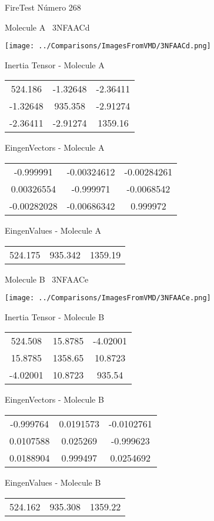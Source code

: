 \vtab[-3cm]
\begin{center}
{\large FireTest \tab Número 268}
\end{center}
\begin{multicols}{2}
\begin{center}

Molecule A \
3NFAACd

\texttt{[image: ../Comparisons/ImagesFromVMD/3NFAACd.png]}

Inertia Tensor - Molecule A \\
\begin{tabular}{|c c c|}
524.186	 & 	-1.32648	 & 	-2.36411	 \\
-1.32648	 & 	935.358	 & 	-2.91274	 \\
-2.36411	 & 	-2.91274	 & 	1359.16
\end{tabular}

\vtab
 EingenVectors - Molecule A     \\
\begin{tabular}{|c c c|}
-0.999991	 & 	-0.00324612	 & 	-0.00284261	 \\
0.00326554	 & 	-0.999971	 & 	-0.0068542	 \\
-0.00282028	 & 	-0.00686342	 & 	0.999972
\end{tabular}

\vtab
 EingenValues - Molecule A     \\
\begin{tabular}{|c c c|}
524.175	 & 	935.342	 & 	1359.19	 \\
\end{tabular}
\columnbreak

Molecule B \
3NFAACe

\texttt{[image: ../Comparisons/ImagesFromVMD/3NFAACe.png]}

Inertia Tensor - Molecule B \\
\begin{tabular}{|c c c|}
524.508	 & 	15.8785	 & 	-4.02001	 \\
15.8785	 & 	1358.65	 & 	10.8723	 \\
-4.02001	 & 	10.8723	 & 	935.54
\end{tabular}

\vtab
 EingenVectors - Molecule B     \\
\begin{tabular}{|c c c|}
-0.999764	 & 	0.0191573	 & 	-0.0102761	 \\
0.0107588	 & 	0.025269	 & 	-0.999623	 \\
0.0188904	 & 	0.999497	 & 	0.0254692
\end{tabular}

\vtab
 EingenValues - Molecule B     \\
\begin{tabular}{|c c c|}
524.162	 & 	935.308	 & 	1359.22	 \\
\end{tabular}

\end{center}
\end{multicols}

